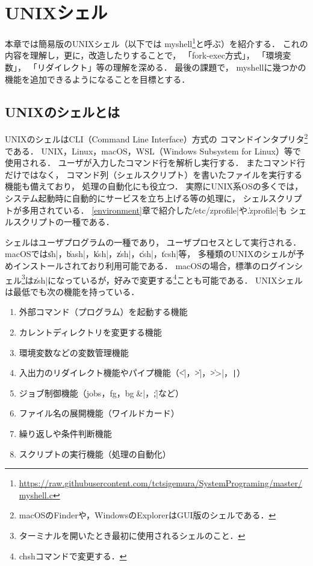 \chapter{UNIXシェル}
本章では簡易版のUNIXシェル（以下では myshell\footnote{
\url{https://raw.githubusercontent.com/tctsigemura/SystemPrograming/master/myshell.c}
}と呼ぶ）を紹介する．
これの内容を理解し，更に，改造したりすることで，
「fork-exec方式」，
「環境変数」，
「リダイレクト」等の理解を深める．
最後の課題で，
myshellに幾つかの機能を追加できるようになることを目標とする．

\section{UNIXのシェルとは}
UNIXのシェルはCLI（Command Line Interface）方式の
コマンドインタプリタ\footnote{
macOSのFinderや，WindowsのExplorerはGUI版のシェルである．}である．
UNIX，Linux，macOS，WSL（Windows Subsystem for Linux）等で使用される．
ユーザが入力したコマンド行を解析し実行する．
またコマンド行だけではなく，
コマンド列（シェルスクリプト）を書いたファイルを実行する機能も備えており，
処理の自動化にも役立つ．
実際にUNIX系OSの多くでは，
システム起動時に自動的にサービスを立ち上げる等の処理に，
シェルスクリプトが多用されている．
\ref{environment}章で紹介した\|/etc/zprofile|や\|.zprofile|も
シェルスクリプトの一種である．

シェルはユーザプログラムの一種であり，
ユーザプロセスとして実行される．
macOSでは\|sh|，\|bash|，\|ksh|，\|zsh|，\|csh|，\|tcsh|等，
多種類のUNIXのシェルが予めインストールされており利用可能である．
macOSの場合，標準のログインシェル\footnote{
ターミナルを開いたとき最初に使用されるシェルのこと．
}は\|zsh|になっているが，好みで変更する\footnote{
chshコマンドで変更する．}ことも可能である．
UNIXシェルは最低でも次の機能を持っている．

\begin{enumerate}
\item 外部コマンド（プログラム）を起動する機能
\item カレントディレクトリを変更する機能
\item 環境変数などの変数管理機能
\item 入出力のリダイレクト機能やパイプ機能（\|<|，\|>|，\|>>|，\verb;|;）
\item ジョブ制御機能（jobs，fg，bg，\|&|，\|;|など）
\item ファイル名の展開機能（ワイルドカード）
\item 繰り返しや条件判断機能
\item スクリプトの実行機能（処理の自動化）
\end{enumerate}

